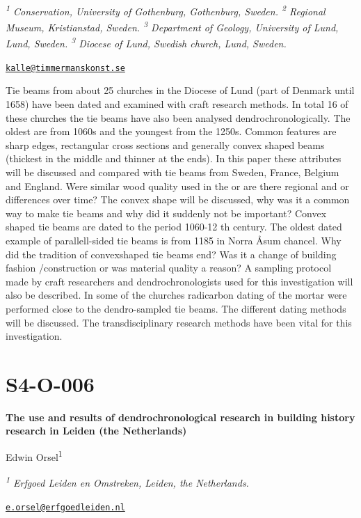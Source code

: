 \documentclass[
]{book}
\begin{document}
\emph{\textsuperscript{1} Conservation, University of Gothenburg, Gothenburg, Sweden. \textsuperscript{2} Regional Museum, Kristianstad, Sweden. \textsuperscript{3} Department of Geology, University of Lund, Lund, Sweden. \textsuperscript{3} Diocese of Lund, Swedish church, Lund, Sweden.}

\href{mailto:kalle@timmermanskonst.se}{\nolinkurl{kalle@timmermanskonst.se}}

Tie beams from about 25 churches in the Diocese of Lund (part of Denmark until 1658) have been dated and examined with craft research methods. In total 16 of these churches the tie beams have also been analysed dendrochronologically. The oldest are from 1060s and the youngest from the 1250s. Common features are sharp edges, rectangular cross sections and generally convex shaped beams (thickest in the middle and thinner at the ends). In this paper these attributes will be discussed and compared with tie beams from Sweden, France, Belgium and England. Were similar wood quality used in the or are there regional and or differences over time? The convex shape will be discussed, why was it a common way to make tie beams and why did it suddenly not be important? Convex shaped tie beams are dated to the period 1060-12 th century. The oldest dated example of parallell-sided tie beams is from 1185 in Norra Åsum chancel. Why did the tradition of convexshaped tie beams end? Was it a change of building fashion /construction or was material quality a reason? A sampling protocol made by craft researchers and dendrochronologists used for this investigation will also be described. In some of the churches radicarbon dating of the mortar were performed close to the dendro-sampled tie beams. The different dating methods will be discussed. The transdisciplinary research methods have been vital for this investigation.

\hypertarget{s4-o-006}{%
\section*{S4-O-006}\label{s4-o-006}}

\textbf{The use and results of dendrochronological research in building history research in Leiden (the Netherlands)}

Edwin Orsel\textsuperscript{1}

\emph{\textsuperscript{1} Erfgoed Leiden en Omstreken, Leiden, the Netherlands.}

\href{mailto:e.orsel@erfgoedleiden.nl}{\nolinkurl{e.orsel@erfgoedleiden.nl}}
\end{document}
